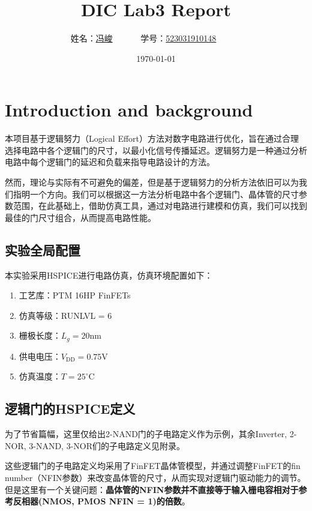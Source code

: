 \documentclass[UTF8,12pt,a4paper]{ctexart}
\title{DIC Lab3 Report}
\author{
	姓名：\underline{冯峻}~~~~~~
	学号：\underline{523031910148}~~~~~~}
\date{\today}
\begin{document}
\fancyfoot[C]{\thepage}

\maketitle
\tableofcontents
\newpage

\section{Introduction and background}
本项目基于逻辑努力（Logical Effort）方法对数字电路进行优化，旨在通过合理选择电路中各个逻辑门的尺寸，以最小化信号传播延迟。逻辑努力是一种通过分析电路中每个逻辑门的延迟和负载来指导电路设计的方法。

然而，理论与实际有不可避免的偏差，但是基于逻辑努力的分析方法依旧可以为我们指明一个方向。我们可以根据这一方法分析电路中各个逻辑门、晶体管的尺寸参数范围，在此基础上，借助仿真工具，通过对电路进行建模和仿真，我们可以找到最佳的门尺寸组合，从而提高电路性能。

\subsection{实验全局配置}
本实验采用HSPICE进行电路仿真，仿真环境配置如下：

\begin{enumerate}
    \item 工艺库：PTM 16HP FinFETs
    \item 仿真等级：RUNLVL = 6
    \item 栅极长度：$L_g = 20$nm
    \item 供电电压：$V_{\text{DD}} = 0.75$V
    \item 仿真温度：$T = 25^\circ\mathrm{C}$
\end{enumerate}

\subsection{逻辑门的HSPICE定义}
为了节省篇幅，这里仅给出2-NAND门的子电路定义作为示例，其余Inverter, 2-NOR, 3-NAND, 3-NOR们的子电路定义见附录。

这些逻辑门的子电路定义均采用了FinFET晶体管模型，并通过调整FinFET的fin number（NFIN参数）来改变晶体管的尺寸，从而实现对逻辑门驱动能力的调节。但是这里有一个关键问题：\textbf{晶体管的NFIN参数并不直接等于输入栅电容相对于参考反相器(NMOS, PMOS NFIN = 1)的倍数}。
\end{document}

